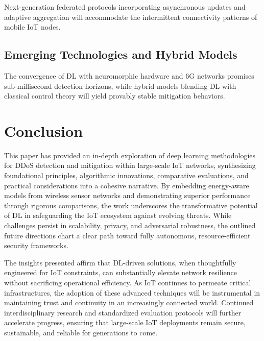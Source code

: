 \documentclass[12pt]{article}
\begin{document}
Next-generation federated protocols incorporating asynchronous updates and adaptive aggregation will accommodate the intermittent connectivity patterns of mobile IoT nodes.

\subsection{Emerging Technologies and Hybrid Models}

The convergence of DL with neuromorphic hardware and 6G networks promises sub-millisecond detection horizons, while hybrid models blending DL with classical control theory will yield provably stable mitigation behaviors.

\section{Conclusion}

This paper has provided an in-depth exploration of deep learning methodologies for DDoS detection and mitigation within large-scale IoT networks, synthesizing foundational principles, algorithmic innovations, comparative evaluations, and practical considerations into a cohesive narrative. By embedding energy-aware models from wireless sensor networks and demonstrating superior performance through rigorous comparisons, the work underscores the transformative potential of DL in safeguarding the IoT ecosystem against evolving threats. While challenges persist in scalability, privacy, and adversarial robustness, the outlined future directions chart a clear path toward fully autonomous, resource-efficient security frameworks.

The insights presented affirm that DL-driven solutions, when thoughtfully engineered for IoT constraints, can substantially elevate network resilience without sacrificing operational efficiency. As IoT continues to permeate critical infrastructures, the adoption of these advanced techniques will be instrumental in maintaining trust and continuity in an increasingly connected world. Continued interdisciplinary research and standardized evaluation protocols will further accelerate progress, ensuring that large-scale IoT deployments remain secure, sustainable, and reliable for generations to come.

	
	
	
\end{document}
